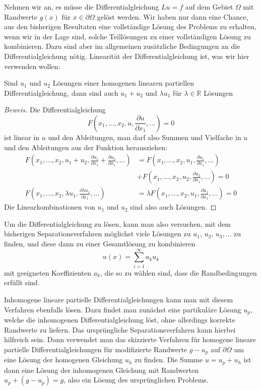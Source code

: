 Nehmen wir an, es müsse die Differentialgleichung $Lu=f$ auf dem
Gebiet $\Omega$ mit Randwerte $g(x)$ für $x\in\partial \Omega$
gelöst werden.
Wir haben nur dann eine Chance, aus den bisherigen Resultaten eine 
vollständige Lösung des Problems zu erhalten, wenn wir in der
Lage sind, solche Teillösungen zu einer vollständigen Lösung
zu kombinieren. Dazu sind aber im allgemeinen zusätzliche
Bedingungen an die Differentialgleichung nötig. Linearität der
Differentialgleichung ist, was wir hier verwenden wollen:

\begin{satz}Sind $u_1$ und $u_2$ Lösungen einer homogenen linearen partiellen
Differentialgleichung, dann sind auch $u_1+u_2$ und $\lambda u_1$ für
$\lambda\in\mathbb R$ Lösungen
\end{satz}

\begin{proof}[Beweis]
Die Differentialgleichung
\[
F(x_1,\dots,x_2,u,\frac{\partial u}{\partial x_1},\dots)=0
\]
ist linear in $u$ und den Ableitungen, man darf also Summen und Vielfache
in $u$ und den Ableitungen aus der Funktion herausziehen:
\begin{align*}
F(x_1,\dots,x_2,u_1+u_2,\frac{\partial u_1}{\partial x_1}+\frac{\partial u_2}{\partial x_1},\dots)
&=
F(x_1,\dots,x_2,u_1,\frac{\partial u_1}{\partial x_1},\dots)
\\
&+
F(x_1,\dots,x_2,u_2,\frac{\partial u_2}{\partial x_1},\dots)=0
\\
F(x_1,\dots,x_2,\lambda u_1,\frac{\partial \lambda u_1}{\partial x_1},\dots)
&=
\lambda
F(x_1,\dots,x_2,u_1,\frac{\partial u_1}{\partial x_1},\dots)
=0
\end{align*}
Die Linearkombinationen von $u_1$ und $u_2$ sind also auch Lösungen.
\end{proof}

Um die Differentialgleichung zu lösen, kann man also versuchen, mit
dem bisherigen Separationsverfahren möglichst viele Lösungen zu
$u_1$, $u_2$, $u_3,\dots$ zu finden, und diese dann zu einer Gesamtlösung
zu kombinieren
\[
u(x)=\sum_{i=1}^\infty a_ku_k
\]
mit geeigneten Koeffizienten $a_k$, die so zu wählen sind, dass die
Randbedingungen erfüllt sind.

Inhomogene lineare partielle Differentialgleichungen kann man mit diesem
Verfahren ebenfalls lösen. Dazu findet man zunächst eine partikuläre
Lösung $u_p$, welche die inhomogenen Differentialgleichung löst, ohne
allerdings korrekte Randwerte zu liefern.
Das ursprüngliche Separationsverfahren kann hierbei hilfreich sein.
Dann verwendet man das skizzierte Verfahren für homogene lineare
partielle Differentialgleichungen für modifizierte Randwerte $g-u_p$ auf
$\partial\Omega$ um eine Lösung der homogenen Gleichung $u_h$ zu finden.
Die Summe $u=u_p+u_h$ ist dann eine Lösung der inhomogenen Gleichung
mit Randwerten $u_p + (g-u_p)=g$, also ein Lösung des ursprünglichen
Problems.

